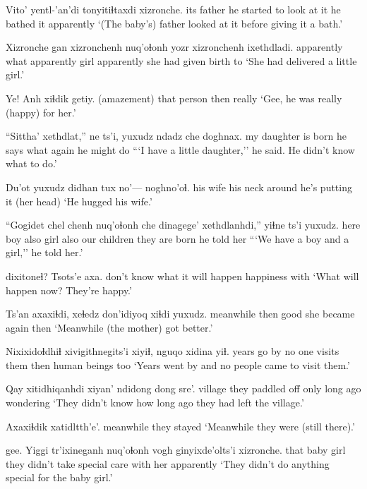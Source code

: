 \documentclass[12pt]{article}
\begin{document}
\gll Vito'      yentl-'an'di tonyitiɬtaxdi xizronche.
{its father} {he started to look at it} {he bathed it} apparently
\glt `(The baby's) father looked at it before giving it a bath.'
\glend

\gll Xizronche gan xizronchenh {nuq'oɬonh yozr} xizronchenh ixethdladi.
apparently        what  apparently      girl    apparently  {she had given birth to}
\glt `She had delivered a little girl.'
\glend

\gll Ye! Anh xiɬdik getiy.
(amazement)  {that person} then really
\glt `Gee, he was really (happy) for her.'
\glend

\gll ``Sittha'     xethdlat,'' ne      ts'i, yuxudz ndadz che doghnax.
{my daughter} {is born} {he says} {} {}   what   again  {he might do}
\glt ```I have a little daughter,'' he said. He didn't know what to do.'
\glend

\gll Du'ot    yuxudz didhan tux no'--- noghno'oɬ.
{his wife} {}   {his neck} around {} {he's putting it (her head)}
\glt `He hugged his wife.'
\glend

\gll ``Gogidet chel chenh nuq'oɬonh che  dinagege'    xethdlanhdi,''   yiɬne       ts'i yuxudz.
here    boy  also  girl      also {our children} {they are born} {he told her}
\glt ```We have a boy and a girl,'' he told her.'
\glend

 dixitoneɬ? Tsots'e axa.
{don't know what} {it will happen}  happiness with
\glt `What will happen now? They're happy.'
\glend

\gll Ts'an axaxiɬdi, xeɬedz don'idiyoq xiɬdi yuxudz.
meanwhile then  good  {she became again} then
\glt `Meanwhile (the mother) got better.'
\glend

\gll Nixixidoɬdhiɬ {xivigithnegits'i} xiyiɬ, {nguqo xidina} yiɬ.
{years go by} {no one visits them}   then  {human beings} too
\glt `Years went by and no people came to visit them.'
\glend

\gll Qay     xitidhiqanhdi xiyan' {ndidong dong} sre'.
village {they paddled off}  only   {long ago} wondering
\glt `They didn't know how long ago they had left the village.'
\glend

\gll Axaxiɬdik xatidltth'e'.
meanwhile  {they stayed}
\glt `Meanwhile they were (still there).'
\glend

\gll gee. Yiggi {tr'ixineganh nuq'oɬonh} {vogh ginyixde'olts'i} xizronche.
{}  that   {baby girl}          {they didn't take special care with her}    apparently
\glt `They didn't do anything special for the baby girl.'
\glend
\end{document}
